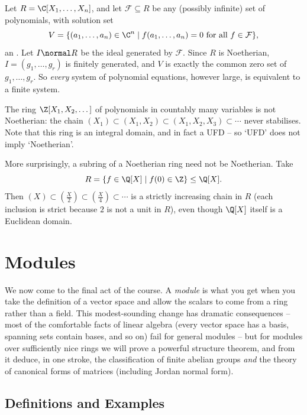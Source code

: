 \begin{example}
	Let $R = \C[X_1, \dots, X_n]$, and let $\mathcal{F} \subseteq R$ be any (possibly infinite) set of polynomials, with solution set
	$$
	V = \{(a_1, \dots, a_n) \in \C^n \mid f(a_1, \dots, a_n) = 0 \text{ for all } f \in \mathcal{F}\},
	$$
	an . Let $I \normal R$ be the ideal generated by $\mathcal F$. Since $R$ is Noetherian, $I = (g_1, \dots, g_r)$ is finitely generated, and $V$ is exactly the common zero set of $g_1, \dots, g_r$. So \emph{every} system of polynomial equations, however large, is equivalent to a finite system.
\end{example}

\begin{example}
	The ring $\Z[X_1, X_2, \dots]$ of polynomials in countably many variables is not Noetherian: the chain $(X_1) \subset (X_1, X_2) \subset (X_1, X_2, X_3) \subset \cdots$ never stabilises. Note that this ring is an integral domain, and in fact a UFD -- so `UFD' does not imply `Noetherian'.

	More surprisingly, a subring of a Noetherian ring need not be Noetherian. Take
	$$
	R = \{f \in \Q[X] \mid f(0) \in \Z\} \leq \Q[X].
	$$
	Then $(X) \subset \left(\frac{X}{2}\right) \subset \left(\frac{X}{4}\right) \subset \cdots$ is a strictly increasing chain in $R$ (each inclusion is strict because $2$ is not a unit in $R$), even though $\Q[X]$ itself is a Euclidean domain.
\end{example}

\section{Modules}

We now come to the final act of the course. A \emph{module} is what you get when you take the definition of a vector space and allow the scalars to come from a ring rather than a field. This modest-sounding change has dramatic consequences -- most of the comfortable facts of linear algebra (every vector space has a basis, spanning sets contain bases, and so on) fail for general modules -- but for modules over sufficiently nice rings we will prove a powerful structure theorem, and from it deduce, in one stroke, the classification of finite abelian groups \emph{and} the theory of canonical forms of matrices (including Jordan normal form).

\subsection{Definitions and Examples}

